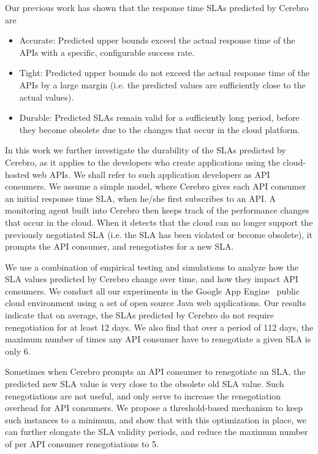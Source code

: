 Our previous work has shown that the response time SLAs predicted by Cerebro are
\begin{itemize}
\item Accurate: Predicted upper bounds exceed the actual response time of the APIs
with a specific, configurable success rate.
\item Tight: Predicted upper bounds do not exceed the actual response time of the APIs by
a large margin (i.e. the predicted values are sufficiently close to the actual values).
\item Durable: Predicted SLAs remain valid for a sufficiently long period, before they
become obsolete due to the changes that occur in the cloud platform.
\end{itemize}

In this work we further investigate the durability of the SLAs predicted by Cerebro, 
as it applies to the developers who create applications using the cloud-hosted web APIs.
We shall refer to such application developers as API consumers. We
assume a simple model, where Cerebro gives each API consumer an initial response
time SLA, when he/she first subscribes to an API. A monitoring agent built into
Cerebro then keeps
track of the performance changes that occur in the cloud. When it detects that the cloud
can no longer support the previously negotiated SLA (i.e. the SLA has been
violated or become obsolete), it prompts the API consumer, and renegotiates for a new
SLA.

We use a combination of empirical testing and simulations to analyze how the SLA values
predicted by Cerebro change over time, and how they impact API consumers. We
conduct all our experiments in the Google App Engine~\cite{gae} public cloud environment 
using a set of open source Java web applications. Our results indicate that on average, the
SLAs predicted by Cerebro do not require renegotiation for at least 12 days. We also find that
over a period of 112 days, the maximum number of times any API consumer have to
renegotiate a given SLA is only 6. 

Sometimes when Cerebro prompts an API consumer to
renegotiate an SLA, the predicted new SLA value is very close to the obsolete old SLA value. 
Such renegotiations are not useful, and only serve to increase the renegotiation overhead
for API consumers. We
propose a threshold-based mechanism to keep such instances to a minimum, and show that
with this optimization in place, we can further elongate the SLA validity periods, and reduce
the maximum number of per API consumer renegotiations to 5. 